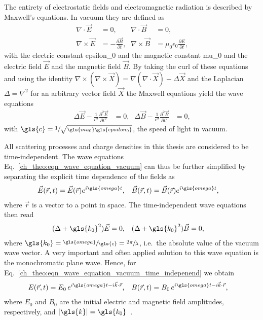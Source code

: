 The entirety of electrostatic fields and electromagnetic radiation is described by Maxwell's equations. In vacuum they are defined as
\begin{align*}
\nabla \cdotp \vec{E} &=0 \text{,} & \nabla \cdotp \vec{B} &=0 \text{,}\\
\nabla \times \vec{E} & = -\frac{\partial \vec{B}}{\partial t}\text{,} & \nabla \times \vec{B} &= \mu_0 \epsilon_0 \frac{\partial E}{\partial t} \text{,}
\end{align*}
with the electric constant \gls{epsilon_0} and the magnetic constant \gls{mu_0} and the electric field $\vec{E}$ and the magnetic field $\vec{B}$. By taking the curl of these equations and using the identity $\nabla \times (\nabla \times \vec{X}) = \nabla (\nabla \cdot \vec{X}) - \Delta \vec{X}$ and the Laplacian $\Delta = \nabla^2$ for an arbitrary vector field $\vec{X}$ the Maxwell equations yield the wave equations
\begin{align}
\Delta \vec{E} - \frac{1}{c^2} \frac{\partial^2 \vec{E}}{\partial t^2} &= 0\text{,}& \Delta \vec{B} - \frac{1}{c^2} \frac{\partial^2 \vec{B}}{\partial t^2} &= 0\text{,} \label{ch_theo:eqn_wave_equation_vacuum}
\end{align}
with $\gls{c} = \sfrac{1}{\sqrt{\gls{mu_0}\gls{epsilon_0}}}$, the speed of light in vacuum.

All scattering processes and charge densities in this thesis are considered to be time-independent. The wave equations Eq.~\eqref{ch_theo:eqn_wave_equation_vacuum} can thus be further simplified by separating the explicit time dependence of the fields as
\begin{align}
\vec{E}(\vec{r},t) &= \vec{E}(\vec{r}) e^{i \gls{omega} t}\text{,} & \vec{B}(\vec{r},t) &= \vec{B}(\vec{r}) e^{i \gls{omega} t}\text{,}
\end{align}
where $\vec{r}$ is a vector to a point in space. The time-independent wave equations then read
\begin{align}
(\Delta  + \gls{k_0}^2 ) \vec{E} &= 0\text{,}& (\Delta  + \gls{k_0}^2 ) \vec{B} &= 0\text{,} \label{ch_theo:eqn_wave_equation_vacuum_time_indepenend}
\end{align}
where $\gls{k_0}= \sfrac{\gls{omega}}{\gls{c}} = \sfrac{2 \pi}{\lambda}$, i.e.~the absolute value of the vacuum wave vector. A very important and often applied solution to this wave equation is the monochromatic plane wave. Hence, for Eq.~\eqref{ch_theo:eqn_wave_equation_vacuum_time_indepenend} we obtain
\begin{align}
E(\vec{r},t) &= E_0 \, e^{i \gls{omega} t - i \vec{k} \cdot \vec{r}}\text{,} & B(\vec{r},t) &= B_0 \, e^{i \gls{omega} t - i \vec{k} \cdot \vec{r}}\text{,} \label{ch_theo:eqn_plain_wave}
\end{align}
where $E_0$ and $B_0$ are the initial electric and magnetic field amplitudes, respectively, and $|\gls{k}| = \gls{k_0}$~\cite{born_principles_1965}.

